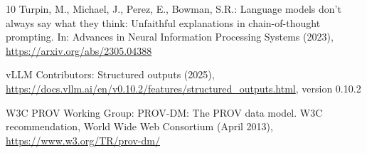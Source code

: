 \documentclass[runningheads]{llncs}
\begin{document}
\begin{thebibliography}{10}
Turpin, M., Michael, J., Perez, E., Bowman, S.R.: Language models don't always
  say what they think: Unfaithful explanations in chain-of-thought prompting.
  In: Advances in Neural Information Processing Systems (2023),
  \url{https://arxiv.org/abs/2305.04388}

{vLLM Contributors}: Structured outputs (2025),
  \url{https://docs.vllm.ai/en/v0.10.2/features/structured_outputs.html},
  version 0.10.2

{W3C PROV Working Group}: {PROV-DM}: The {PROV} data model. {W3C}
  recommendation, World Wide Web Consortium (April 2013),
  \url{https://www.w3.org/TR/prov-dm/}

\end{thebibliography}
\end{document}
